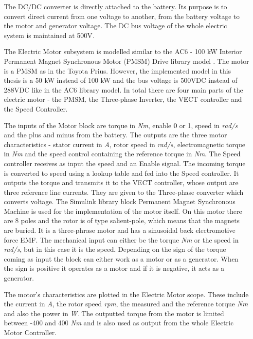 The DC/DC converter is directly attached to the battery. Its purpose is to convert direct current from one voltage to another, from the battery voltage to the motor and generator voltage. The DC bus voltage of the whole electric system is maintained at 500V. 

The Electric Motor subsystem is modelled similar to the AC6 - 100 kW Interior Permanent Magnet Synchronous Motor (PMSM) Drive library model \citep{ac6Matlab}. The motor is a PMSM as in the Toyota Prius. However, the implemented model in this thesis is a 50 kW instead of 100 kW and the bus voltage is 500VDC instead of 288VDC like in the AC6 library model. In total there are four main parts of the electric motor - the PMSM, the Three-phase Inverter, the VECT controller and the Speed Controller. 

The inputs of the Motor block are torque in \textit{Nm}, enable 0 or 1, speed in \textit{rad/s} and the plus and minus from the battery. The outputs are the three motor characteristics - stator current in \textit{A}, rotor speed in \textit{rad/s}, electromagnetic torque in \textit{Nm} and the speed control containing the reference torque in \textit{Nm}. The Speed controller receives as input the speed and an Enable signal. The incoming torque is converted to speed using a lookup table and fed into the Speed controller. It outputs the torque and transmits it to the VECT controller, whose output are three reference line currents. They are given to the Three-phase converter which converts voltage. The Simulink library block Permanent Magnet Synchronous Machine \citep{pmsmMatlab} is used for the implementation of the motor itself. On this motor there are 8 poles and the rotor is of type salient-pole, which means that the magnets are buried. It is a three-phrase motor and has a sinusoidal back electromotive force EMF. The mechanical input can either be the torque \textit{Nm} or the speed in \textit{rad/s}, but in this case it is the speed. Depending on the sign of the torque coming as input the block can either work as a motor or as a generator. When the sign is positive it operates as a motor and if it is negative, it acts as a generator. 

The motor's characteristics are plotted in the Electric Motor scope. These include the current in \textit{A}, the rotor speed \textit{rpm}, the measured and the reference torque \textit{Nm} and also the power in \textit{W}. The outputted torque from the motor is limited between -400 and 400 \textit{Nm} and is also used as output from the whole Electric Motor Controller.

